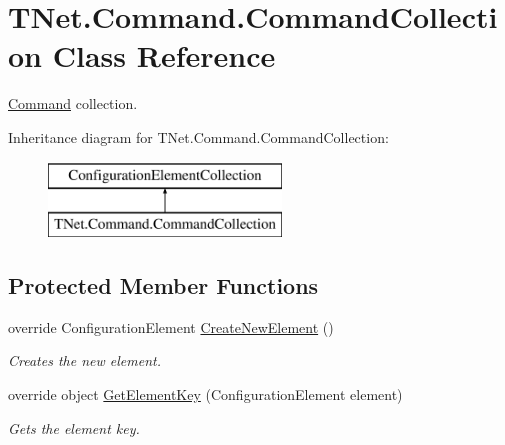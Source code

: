 \hypertarget{class_t_net_1_1_command_1_1_command_collection}{}\section{T\+Net.\+Command.\+Command\+Collection Class Reference}
\label{class_t_net_1_1_command_1_1_command_collection}


\mbox{\hyperlink{namespace_t_net_1_1_command}{Command}} collection.  


Inheritance diagram for T\+Net.\+Command.\+Command\+Collection\+:\begin{figure}[H]
\begin{center}
\leavevmode
\includegraphics[height=2.000000cm]{class_t_net_1_1_command_1_1_command_collection}
\end{center}
\end{figure}
\subsection*{Protected Member Functions}
\begin{DoxyCompactItemize}
\item 
override Configuration\+Element \mbox{\hyperlink{class_t_net_1_1_command_1_1_command_collection_ac298705d27479f3f87108635af6e13b9}{Create\+New\+Element}} ()
\begin{DoxyCompactList}\small\item\em Creates the new element. \end{DoxyCompactList}\item 
override object \mbox{\hyperlink{class_t_net_1_1_command_1_1_command_collection_afc986053d2fb63b0bd015e8538aed181}{Get\+Element\+Key}} (Configuration\+Element element)
\begin{DoxyCompactList}\small\item\em Gets the element key. \end{DoxyCompactList}\end{DoxyCompactItemize}
